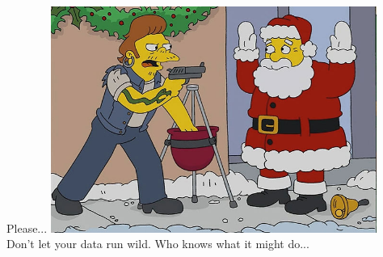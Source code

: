 \documentclass{beamer}
\begin{document}
\begin{frame}{Please...}
    \centering
    { 
        \includegraphics[width=0.8\textwidth]{snake.jpg}
        \\
        Don't let your data run wild. Who knows what it might do...
    }
\end{frame}
\end{document}
